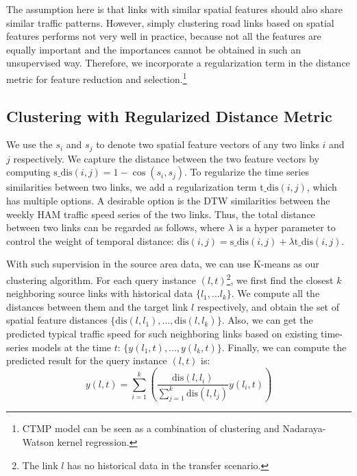\documentclass[letterpaper]{article} %
\begin{document}
The assumption here is that links with similar spatial features should also share similar traffic patterns.
However, simply clustering road links based on spatial features performs not very well in practice, because not all the features are equally important and the importances cannot be obtained in such an unsupervised way.
Therefore, we incorporate a regularization term in the distance metric for feature reduction and selection.\footnote{CTMP model can be seen as a combination of clustering and Nadaraya-Watson kernel regression.}

\subsection{Clustering with Regularized Distance Metric}
We use the $s_i$ and $s_j$ to denote two spatial feature vectors of any two links $i$ and $j$ respectively.
We capture the distance between the two feature vectors by computing $\text{s\_dis}(i,j) = 1-\cos(s_i,s_j)$.
To regularize the time series similarities between two links, we add a regularization term $\text{t\_dis}(i,j)$, which has multiple options.
A desirable option is the DTW \cite{} similarities between the weekly HAM traffic speed series of the two links.
Thus, the total distance between two links can be regarded as follows, where $\lambda$ is a hyper parameter to control the weight of temporal distance:
$\text{dis}(i,j) =  \text{s\_dis}(i,j) + \lambda \text{t\_dis}(i,j) $.

With such supervision in the source area data,
we can use K-means as our clustering algorithm.
For each query instance $(l,t)$\footnote{The link $l$ has no historical data in the transfer scenario.}, we first find the closest $k$ neighboring source links with historical data $\{l_1,...l_k\}$.
We compute all the distances between them and the target link $l$ respectively, and obtain the set of spatial feature distances $\{\text{dis}(l,l_1),...,\text{dis}(l,l_k)\}$.
Also, we can get the predicted typical traffic speed for such neighboring links based on existing time-series models  at the time $t$: $\{y(l_1,t),...,y(l_k,t)\}$.
Finally, we can compute the predicted result for the query instance $(l,t)$ is:
$$ y(l,t) = \sum_{i=1}^k \left( \frac{\text{dis}(l,l_i)}{\sum_{j=1}^k \text{dis}(l,l_j)} 
y(l_i,t)
\right)$$ 
\end{document}

